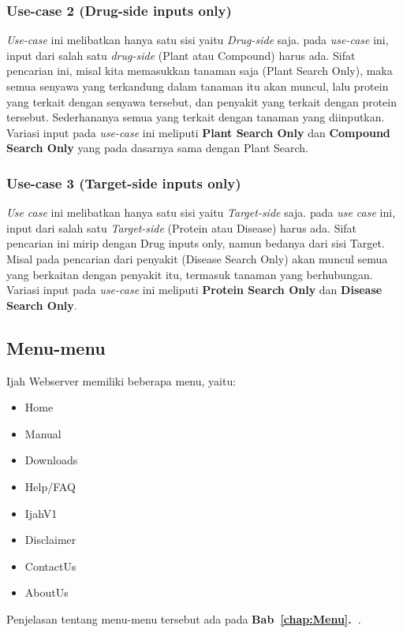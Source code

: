 		\subsubsection{Use-case 2 (Drug-side inputs only)} \label{sssec:drug only}
		\emph{Use-case} ini melibatkan hanya satu sisi yaitu \emph{Drug-side} saja. pada \emph{use-case} ini, input dari salah satu \emph{drug-side} (Plant atau Compound) harus ada. Sifat pencarian ini, misal kita memasukkan tanaman saja (Plant Search Only), maka semua senyawa yang terkandung dalam tanaman itu akan muncul, lalu protein yang terkait dengan senyawa tersebut, dan penyakit yang terkait dengan protein tersebut. Sederhananya semua yang terkait dengan tanaman yang diinputkan. Variasi input pada \emph{use-case} ini meliputi \textbf{Plant Search Only} dan \textbf{Compound Search Only} yang pada dasarnya sama dengan Plant Search.
		\subsubsection{Use-case 3 (Target-side inputs only)} \label{sssec:target only}
		\emph{Use case} ini melibatkan hanya satu sisi yaitu \emph{Target-side} saja. pada \emph{use case} ini, input dari salah satu \emph{Target-side} (Protein atau Disease) harus ada. Sifat pencarian ini mirip dengan Drug inputs only, namun bedanya dari sisi Target. Misal pada pencarian dari penyakit (Disease Search Only) akan muncul semua yang berkaitan dengan penyakit itu, termasuk tanaman yang berhubungan. Variasi input pada \emph{use-case} ini meliputi \textbf{Protein Search Only} dan \textbf{Disease Search Only}.


	\subsection{Menu-menu} %
	Ijah Webserver memiliki beberapa menu, yaitu:
	\begin{itemize}
	\item Home
	\item Manual
	\item Downloads
	\item Help/FAQ
	\item IjahV1
	\item Disclaimer
	\item ContactUs
	\item AboutUs
	\end{itemize}
	Penjelasan tentang menu-menu tersebut ada pada \textbf{Bab~\ref{chap:Menu}.~}.

